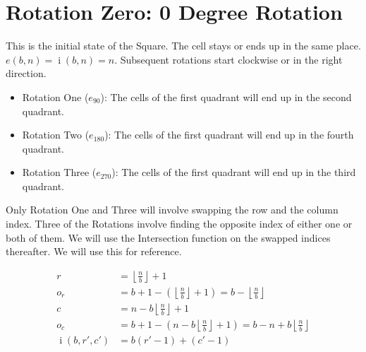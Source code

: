 \documentclass[twoside,openany,12pt]{book}
\begin{document}
    \section{Rotation Zero: 0 Degree Rotation}
    This is the initial state of the Square. The cell stays or ends up in the same place. $e(b,n)=\operatorname{i}(b,n) = n$. Subsequent rotations start clockwise or in the right direction. 
    \begin{itemize}
      \item Rotation One ($e_{90}$): The cells of the first quadrant will end up in the second quadrant.
      \item Rotation Two ($e_{180}$): The cells of the first quadrant will end up in the fourth quadrant.
      \item Rotation Three ($e_{270}$): The cells of the first quadrant will end up in the third quadrant.
    \end{itemize}
    Only Rotation One and Three will involve swapping the row and the column index. Three of the Rotations involve finding the opposite index of either one or both of them. We will use the Intersection function on the swapped indices thereafter. We will use this for reference.
\par\nopagebreak
    \begin{align*}
        r &= \left\lfloor \frac{n}{b} \right\rfloor + 1 \\
        o_r &= b + 1 - (\left\lfloor \frac{n}{b} \right\rfloor + 1) = b - \left\lfloor \frac{n}{b} \right\rfloor\\
        c &= n - b\left\lfloor \frac{n}{b} \right\rfloor + 1 \\
        o_c &= b + 1 - (n - b\left\lfloor \frac{n}{b} \right\rfloor + 1) = b - n + b\left\lfloor \frac{n}{b} \right\rfloor \\
        \operatorname{i}(b,r',c') &= b(r'-1) + (c'-1) 
    \end{align*}
\end{document}
